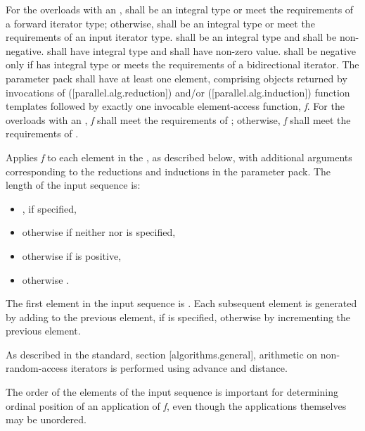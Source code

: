 \begin{itemdescr}
\pnum \requires For the overloads with an ,  shall be an integral type or meet the requirements of a forward iterator type; otherwise,  shall be an integral type or meet the requirements of an input iterator type.  shall be an integral type and  shall be non-negative.  shall have integral type and  shall have non-zero value.  shall be negative only if  has integral type or meets the requirements of a bidirectional iterator. The  parameter pack shall have at least one element, comprising objects returned by invocations of  ([parallel.alg.reduction]) and/or  ([parallel.alg.induction]) function templates followed by exactly one invocable element-access function, {\em f}. For the overloads with an , {\em f} shall meet the requirements of ; otherwise, {\em f} shall meet the requirements of .

\pnum \effects Applies {\em f} to each element in the , as described below, with additional arguments corresponding to the reductions and inductions in the  parameter pack. The length of the input sequence is:

\begin{itemize}
\item {}, if specified,

\item otherwise  if neither  nor  is specified,

\item otherwise  if  is positive,

\item otherwise .
\end{itemize}

The first element in the input sequence is . Each subsequent element is generated by adding  to the previous element, if  is specified, otherwise by incrementing the previous element.
\begin{note}As described in the \Cpp standard, section [algorithms.general], arithmetic on non-random-access iterators is performed using advance and distance.\end{note}
\begin{note}The order of the elements of the input sequence is important for determining ordinal position of an application of {\em f}, even though the applications themselves may be unordered.\end{note}


\end{itemdescr}
